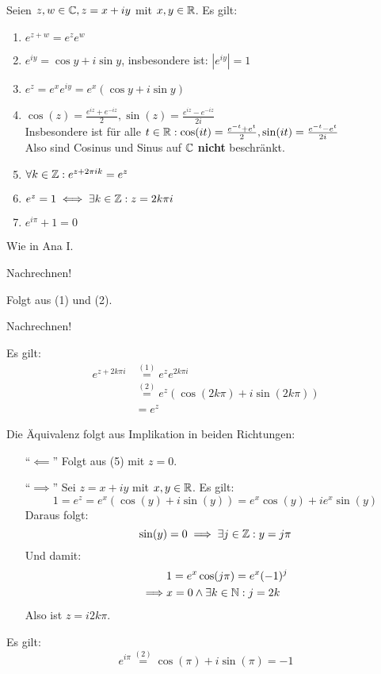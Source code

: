 \documentclass[a4paper,twoside,DIV15,BCOR12mm,chapterprefix=true,headings=twolinechapter]{scrbook}
\begin{document}
\begin{satz}
Seien $z,w\in\mathbb{C}, z=x+iy$ mit $x,y\in\mathbb{R}$. Es gilt:
\begin{enumerate}
\item $e^{z+w}=e^z e^w$
\item $e^{iy}=\cos y+i\sin y$, insbesondere ist: $|e^{iy}|=1$
\item $e^z=e^x e^{iy}=e^x(\cos y+i\sin y)$
\item $ \cos (z)=\frac{e^{iz}+e^{-iz}}{2}, \sin (z)=\frac{e^{iz}-e^{-iz}}{2i}$\\
Insbesondere ist für alle $t\in\mathbb{R}: \cos(it)=\frac{e^{-t}+e^t}{2}, 
\sin(it)=\frac{e^{-t}-e^t}{2i}$\\
Also sind Cosinus und Sinus auf $\mathbb{C}$ \textbf{nicht} beschränkt.
\item $\forall k\in\mathbb{Z}:e^{z+2\pi i k}=e^z$
\item $e^z=1 \iff \exists k\in\mathbb{Z}:z=2k\pi i$
\item $e^{i\pi}+1=0$
\end{enumerate}
\end{satz}

\begin{beweise}
\item Wie in Ana I.
\item Nachrechnen!
\item Folgt aus (1) und (2).
\item Nachrechnen!
\item Es gilt:
\begin{align*}
e^{z+2k\pi i} &\stackrel{(1)}{=}e^ze^{2k\pi i}\\
&\stackrel{(2)}{=}e^z(\cos(2k\pi)+i\sin(2k\pi))\\
&= e^z
\end{align*}
\item
Die Äquivalenz folgt aus Implikation in beiden Richtungen:
\begin{enumerate}
\item["`$\impliedby$"'] Folgt aus (5) mit $z=0$.
\item["`$\implies$"'] Sei $z=x+iy$ mit $x,y\in\mathbb{R}$. Es gilt:
\[1=e^z=e^x(\cos(y)+i\sin(y))=e^x\cos(y)+ie^x\sin(y)\]
Daraus folgt:
\[\sin(y)=0\implies \exists j\in\mathbb{Z}:y=j\pi\]
Und damit:
\begin{align*}
&1=e^x\cos(j\pi)=e^x(-1)^j\\
\implies &x=0\wedge\exists k\in\mathbb{N}: j=2k
\end{align*}
Also ist $z=i2k\pi$.
\end{enumerate}
\item Es gilt:
\[e^{i\pi}\stackrel{(2)}{=}\cos(\pi)+i\sin(\pi)=-1\]
\end{beweise}
\end{document}
